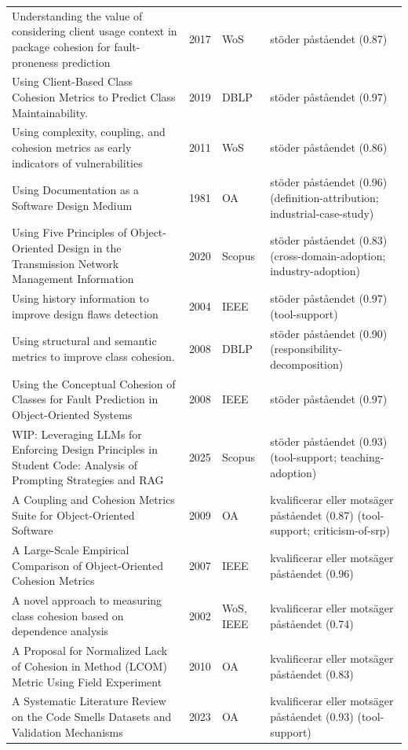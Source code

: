 \begin{longtable}{@{}%
  >{\raggedright\arraybackslash}p{}c%
  >{\raggedright\arraybackslash}p{}%
  >{\raggedright\arraybackslash}p{}@{}}
Understanding the value of considering client usage context in package cohesion for fault-proneness prediction & 2017 & WoS & stöder påståendet (0.87) \\
Using Client-Based Class Cohesion Metrics to Predict Class Maintainability. & 2019 & DBLP & stöder påståendet (0.97) \\
Using complexity, coupling, and cohesion metrics as early indicators of vulnerabilities & 2011 & WoS & stöder påståendet (0.86) \\
Using Documentation as a Software Design Medium & 1981 & OA & stöder påståendet (0.96) (definition-attribution; industrial-case-study) \\
Using Five Principles of Object-Oriented Design in the Transmission Network Management Information & 2020 & Scopus & stöder påståendet (0.83) (cross-domain-adoption; industry-adoption) \\
Using history information to improve design flaws detection & 2004 & IEEE & stöder påståendet (0.97) (tool-support) \\
Using structural and semantic metrics to improve class cohesion. & 2008 & DBLP & stöder påståendet (0.90) (responsibility-decomposition) \\
Using the Conceptual Cohesion of Classes for Fault Prediction in Object-Oriented Systems & 2008 & IEEE & stöder påståendet (0.97) \\
WIP: Leveraging LLMs for Enforcing Design Principles in Student Code: Analysis of Prompting Strategies and RAG & 2025 & Scopus & stöder påståendet (0.93) (tool-support; teaching-adoption) \\
A Coupling and Cohesion Metrics Suite for Object-Oriented Software & 2009 & OA & kvalificerar eller motsäger påståendet (0.87) (tool-support; criticism-of-srp) \\
A Large-Scale Empirical Comparison of Object-Oriented Cohesion Metrics & 2007 & IEEE & kvalificerar eller motsäger påståendet (0.96) \\
A novel approach to measuring class cohesion based on dependence analysis & 2002 & WoS, IEEE & kvalificerar eller motsäger påståendet (0.74) \\
A Proposal for Normalized Lack of Cohesion in Method (LCOM) Metric Using Field Experiment & 2010 & OA & kvalificerar eller motsäger påståendet (0.83) \\
A Systematic Literature Review on the Code Smells Datasets and Validation Mechanisms & 2023 & OA & kvalificerar eller motsäger påståendet (0.93) (tool-support) \\

\end{longtable}
